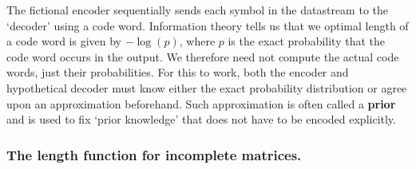 \documentclass{llncs}
\begin{document}

The fictional encoder sequentially sends each symbol in the datastream to the `decoder' using a code word. Information theory tells us that we optimal length of a code word is given by $-\log(p)$, where $p$ is the exact probability that the code word occurs in the output. We therefore need not compute the actual code words, just their probabilities. For this to work, both the encoder and hypothetical decoder must know either the exact probability distribution or agree upon an approximation beforehand. Such approximation is often called a \textbf{prior} and is used to fix `prior knowledge' that does not have to be encoded explicitly. 



\subsubsection{The length function for incomplete matrices.}
\end{document}
